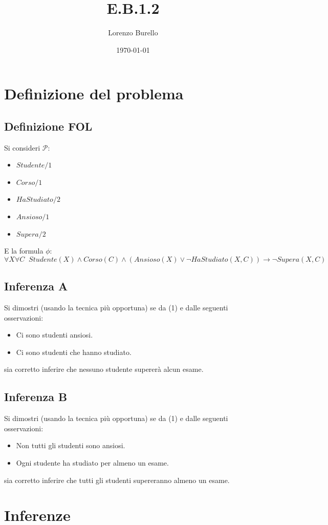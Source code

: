 \documentclass[a4paper, 12pt]{article}
\title{E.B.1.2}
\author{Lorenzo Burello}
\date{\today}
\begin{document}
\maketitle

\section{Definizione del problema}
\subsection{Definizione FOL}
Si consideri $\mathcal{P}$:
\begin{itemize}[label=-]
    \item $Studente/1$
    \item $Corso/1$
    \item $HaStudiato/2$
    \item $Ansioso/1$
    \item $Supera/2$
\end{itemize}
E la formula $\phi$:
\begin{equation}
    \forall X \forall C \;\; Studente(X)\land Corso(C) \land (Ansioso(X) \lor \lnot HaStudiato(X,C)) \rightarrow \lnot Supera(X, C)
\end{equation}
\subsection{Inferenza A}
Si dimostri (usando la tecnica più opportuna) se da (1) e dalle seguenti osservazioni:
\begin{itemize}
    \item Ci sono studenti ansiosi.
    \item Ci sono studenti che hanno studiato.
\end{itemize}
sia corretto inferire che nessuno studente supererà alcun esame.
\subsection{Inferenza B}
Si dimostri (usando la tecnica più opportuna) se da (1) e dalle seguenti osservazioni:
\begin{itemize}
    \item Non tutti gli studenti sono ansiosi.
    \item Ogni studente ha studiato per almeno un esame.
\end{itemize}
sia corretto inferire che tutti gli studenti supereranno almeno un esame.
\section{Inferenze}
\end{document}
